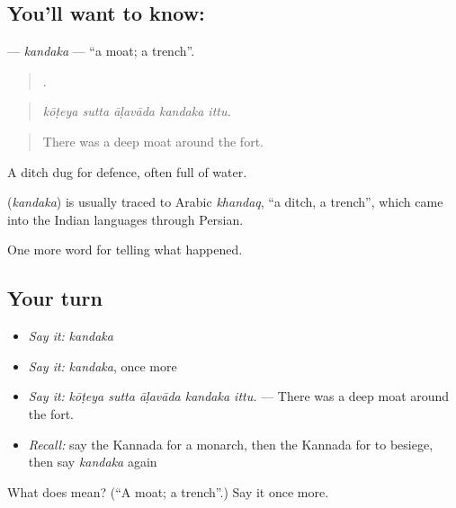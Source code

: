 \subsection*{You'll want to know: }
\textbf{} — \emph{kandaka} — \textquotedblleft{}a moat; a trench\textquotedblright{}.

\begin{quote}
    .
\end{quote}

\begin{quote}
\emph{kōṭeya sutta āḷavāda kandaka ittu.}
\end{quote}

\begin{quote}
There was a deep moat around the fort.
\end{quote}

A ditch dug for defence, often full of water.

\begin{cousinweb}
\textbf{} (\emph{kandaka}) is usually traced to Arabic \emph{khandaq}, \textquotedblleft{}a ditch, a trench\textquotedblright{}, which came into the Indian languages through Persian.
\end{cousinweb}

\begin{grammarlens}[title={What you've built}]
One more word for telling what happened.
\end{grammarlens}

\subsection*{Your turn}
\begin{itemize}
\raggedright
  \item \emph{Say it:} \emph{kandaka}
  \item \emph{Say it:} \emph{kandaka}, once more
  \item \emph{Say it:} \emph{kōṭeya sutta āḷavāda kandaka ittu.} — There was a deep moat around the fort.
  \item \emph{Recall:} say the Kannada for a monarch, then the Kannada for to besiege, then say \emph{kandaka} again
\end{itemize}

\begin{tcolorbox}[breakable,colback=teal!4,colframe=teal!35!black,title={Before you move on}]
What does  mean? (\textquotedblleft{}A moat; a trench\textquotedblright{}.) Say it once more.
\end{tcolorbox}
